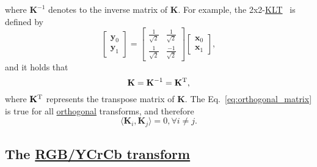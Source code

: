 where ${\mathbf{K}}^{-1}$ denotes to the inverse matrix of $\mathbf{K}$. For example, the
2x2-\href{https://en.wikipedia.org/wiki/Karhunen-Loeve_theorem}{KLT}~\cite{sayood2017introduction}
is defined by
\begin{equation}
  \begin{bmatrix}
    {\mathbf{y}}_0 \\
    {\mathbf{y}}_1
  \end{bmatrix}
  = 
  \begin{bmatrix} \frac{1}{\sqrt{2}} & \frac{1}{\sqrt{2}} \\ \frac{1}{\sqrt{2}} & \frac{-1}{\sqrt{2}} \end{bmatrix}
  \begin{bmatrix}
    {\mathbf{x}}_0 \\
    {\mathbf{x}}_1
  \end{bmatrix},
  \label{eq:KLT_transform}
\end{equation}
and it holds that
\begin{equation}
  \mathbf{K}={\mathbf{K}}^{-1}={\mathbf{K}}^{\text T},
  \label{eq:orthogonal_matrix}
\end{equation}
where ${\mathbf{K}}^{\text T}$ represents the transpose matrix of $\mathbf{K}$. The
Eq.~\ref{eq:orthogonal_matrix} is true for all
\href{https://en.wikipedia.org/wiki/Orthogonality}{orthogonal}
transforms, and therefore
\begin{equation}
  \langle {\mathbf{K}}_i, {\mathbf{K}}_j\rangle = 0, \forall i\neq j.
\end{equation}

\subsection{The \href{https://en.wikipedia.org/wiki/YCbCr}{RGB/YCrCb transform}}
